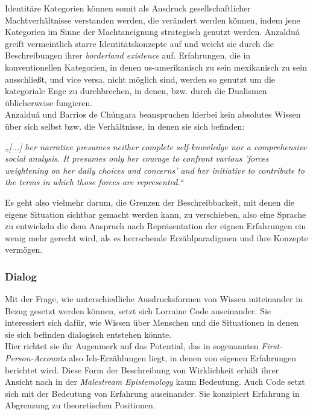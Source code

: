 \noindent Identitäre Kategorien können somit als Ausdruck gesellschaftlicher
Machtverhältnisse verstanden werden, die verändert werden können, indem jene
Kategorien im Sinne der Machtaneignung strategisch genutzt werden. Anzalduá
greift vermeintlich starre Identitätskonzepte auf und weicht sie durch die
Beschreibungen ihrer \textit{borderland existence} auf. Erfahrungen, die in
konventionellen Kategorien, in denen us-amerikanisch zu sein mexikanisch zu
sein ausschließt, und vice versa, nicht möglich sind, werden so genutzt um die
kategoriale Enge zu durchbrechen, in denen, bzw. durch die  Dualismen
üblicherweise fungieren.\footnotemark{}\\
Anzalduá und Barrios de Chúngara beanspruchen hierbei kein absolutes Wissen über sich selbst bzw. die Verhältnisse, in denen sie sich befinden: 
\begin{myenv}\textit{
  „[...] her narrative presumes neither complete self-knowledge nor a
  comprehensive social analysis. It presumes only her courage to confront
  various 'forces weightening on her daily choices and concerns' and her
  initiative to contribute to the terms in which those forces are
  represented.“}\footnotemark{}
\end{myenv}
Es geht also vielmehr darum, die Grenzen der Beschreibbarkeit, mit denen die
eigene Situation sichtbar gemacht werden kann, zu verschieben, also eine
Sprache zu entwickeln die dem Anspruch nach Repräsentation der eignen
Erfahrungen ein wenig mehr gerecht wird, als es herrschende Erzählparadigmen
und ihre Konzepte vermögen.

\subsubsection{Dialog}

Mit der Frage, wie unterschiedliche Ausdrucksformen von Wissen miteinander
in Bezug gesetzt werden können, setzt sich Lorraine Code auseinander. Sie
interessiert sich dafür,  wie Wissen über Menschen und die  Situationen in
denen sie sich befinden dialogisch entstehen könnte.\\
 Hier richtet sie ihr
Augenmerk auf das Potential, das in sogenannten \textit{First-Person-Accounts} also
Ich-Erzählungen liegt, in denen von eigenen Erfahrungen berichtet wird. Diese
Form der Beschreibung von Wirklichkeit erhält ihrer Ansicht nach in der
\textit{Malestream Epistemology} kaum Bedeutung.\footnotemark {} Auch Code setzt sich mit der Bedeutung von Erfahrung auseinander. Sie konzipiert Erfahrung in Abgrenzung zu theoretischen Positionen. \\

